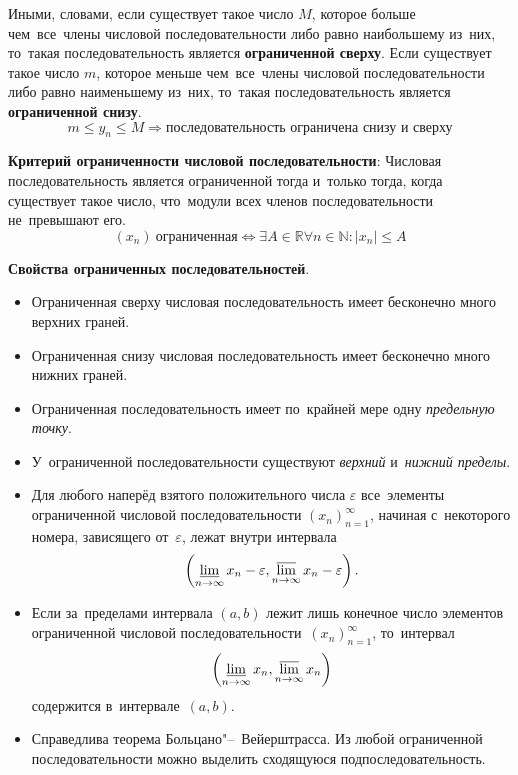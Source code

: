 \documentclass[]{scrartcl}
\begin{document}
{{Иными, словами, если существует такое число ${\textstyle M}$, которое больше чем~все~члены числовой последовательности либо равно наибольшему из~них, то~такая последовательность является \textbf{ограниченной сверху}. Если существует такое число ${\textstyle m}$, которое меньше чем~все~члены числовой последовательности либо равно наименьшему из~них, то~такая последовательность является \textbf{ограниченной снизу}.
\begin{equation}\label{eq:numerical-sequence-limits}
m\leq y_n \leq M \Rightarrow \text{последовательность ограничена снизу и~сверху}
\end{equation}

\textbf{Критерий ограниченности числовой последовательности}: Числовая последовательность является ограниченной тогда и~только тогда, когда существует такое число, что~модули всех членов последовательности не~превышают его.
\begin{equation}\label{eq:sequence-limit-criteria}
(x_n)\ \text{ограниченная} \Leftrightarrow \exists A \in \mathbb{R} \forall n \in \mathbb{N}:|x_n|\leq A
\end{equation} 

\textbf{Свойства ограниченных последовательностей}.
\begin{itemize}
	\item Ограниченная сверху числовая последовательность имеет бесконечно много верхних граней.
	\item Ограниченная снизу числовая последовательность имеет бесконечно много нижних граней.
	\item Ограниченная последовательность имеет по~крайней мере одну \emph{предельную точку}.
	\item У~ограниченной последовательности существуют \emph{верхний} и~\emph{нижний пределы}.
	\item Для любого наперёд взятого положительного числа ${\textstyle \varepsilon}$ все~элементы ограниченной числовой последовательности ${\textstyle \left(x_{n}\right)_{n=1}^{\infty }}$, начиная с~некоторого номера, зависящего от~${\textstyle \varepsilon}$, лежат внутри интервала
	\begin{equation}\label{eq:sequence-limit-prop1}
	\left(\varliminf_{n\to \infty} x_n - \varepsilon, \varlimsup_{n\to \infty} x_n - \varepsilon \right).
	\end{equation}
	\item Если за~пределами интервала ${\textstyle \left(a,b\right)}$ лежит лишь конечное число элементов ограниченной числовой последовательности~${\textstyle \left(x_{n}\right)_{n=1}^{\infty }}$, то~интервал
	\begin{equation}\label{eq:sequence-limit-prop2}
	\left(\varliminf_{n\to \infty} x_n, \varlimsup_{n\to \infty} x_n \right)
	\end{equation}
	содержится в~интервале~${\textstyle \left(a,b\right)}$.
	\item Справедлива теорема Больцано"--~Вейерштрасса. Из любой ограниченной последовательности можно выделить сходящуюся подпоследовательность.
\end{itemize}

}}
\end{document}
